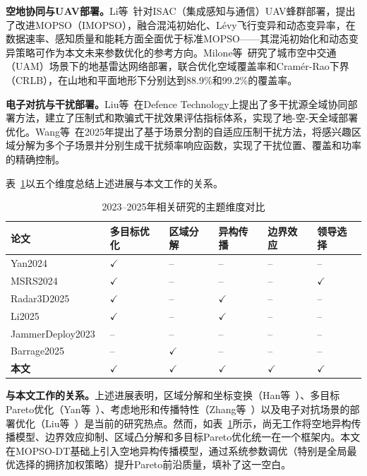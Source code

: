 \textbf{空地协同与UAV部署。}Li等~\cite{Li2025}针对ISAC（集成感知与通信）UAV蜂群部署，提出了改进MOPSO（IMOPSO），融合混沌初始化、Lévy飞行变异和动态变异率，在数据速率、感知质量和能耗方面全面优于标准MOPSO——其混沌初始化和动态变异策略可作为本文未来参数优化的参考方向。Milone等~\cite{Milone2024}研究了城市空中交通（UAM）场景下的地基雷达网络部署，联合优化空域覆盖率和Cramér-Rao下界（CRLB），在山地和平面地形下分别达到88.9\%和99.2\%的覆盖率。

\textbf{电子对抗与干扰部署。}Liu等~\cite{JammerDeploy2023}在Defence Technology上提出了多干扰源全域协同部署方法，建立了压制式和欺骗式干扰效果评估指标体系，实现了地-空-天全域部署优化。Wang等~\cite{Barrage2025}在2025年提出了基于场景分割的自适应压制干扰方法，将感兴趣区域分解为多个子场景并分别生成干扰频率响应函数，实现了干扰位置、覆盖和功率的精确控制。

表~\ref{tab:recent_comparison}以五个维度总结上述进展与本文工作的关系。

\begin{table}[h]
\centering
\caption{2023--2025年相关研究的主题维度对比}
\label{tab:recent_comparison}
\begin{tabular}{p{1.8cm}p{1.3cm}p{1.3cm}p{1.3cm}p{1.3cm}p{1.3cm}}
\toprule
\textbf{论文} & \textbf{多目标优化} & \textbf{区域分解} & \textbf{异构传播} & \textbf{边界效应} & \textbf{领导选择} \\
\midrule
Yan2024~\cite{Yan2024} & $\checkmark$ & -- & -- & -- & -- \\
MSRS2024~\cite{MSRS2024} & $\checkmark$ & -- & -- & -- & $\checkmark$ \\
Radar3D2025~\cite{Radar3D2025} & $\checkmark$ & -- & $\checkmark$ & -- & -- \\
Li2025~\cite{Li2025} & $\checkmark$ & -- & $\checkmark$ & -- & -- \\
JammerDeploy2023~\cite{JammerDeploy2023} & -- & -- & -- & -- & -- \\
Barrage2025~\cite{Barrage2025} & -- & $\checkmark$ & -- & -- & -- \\
\textbf{本文} & $\checkmark$ & $\checkmark$ & $\checkmark$ & $\checkmark$ & $\checkmark$ \\
\bottomrule
\end{tabular}
\end{table}

\textbf{与本文工作的关系。}上述进展表明，区域分解和坐标变换（Han等~\cite{Han2025}）、多目标Pareto优化（Yan等~\cite{Yan2024}）、考虑地形和传播特性（Zhang等~\cite{Radar3D2025}）以及电子对抗场景的部署优化（Liu等~\cite{JammerDeploy2023}）是当前的研究热点。然而，如表~\ref{tab:recent_comparison}所示，尚无工作将空地异构传播模型、边界效应抑制、区域凸分解和多目标Pareto优化统一在一个框架内。本文在MOPSO-DT基础上引入空地异构传播模型，通过系统参数调优（特别是全局最优选择的拥挤加权策略）提升Pareto前沿质量，填补了这一空白。
